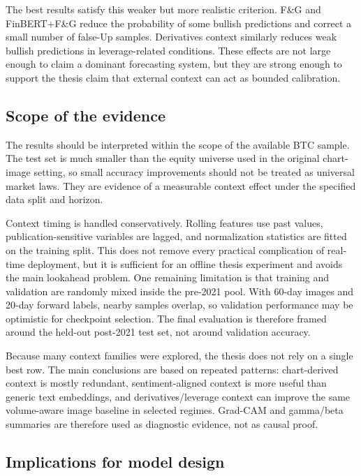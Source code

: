 \documentclass[14pt,a4paper]{extarticle}
\begin{document}
The best results satisfy this weaker but more realistic criterion. F\&G and FinBERT+F\&G reduce the probability of some bullish predictions and correct a small number of false-Up samples. Derivatives context similarly reduces weak bullish predictions in leverage-related conditions. These effects are not large enough to claim a dominant forecasting system, but they are strong enough to support the thesis claim that external context can act as bounded calibration.

\subsection{Scope of the evidence}

The results should be interpreted within the scope of the available BTC sample. The test set is much smaller than the equity universe used in the original chart-image setting, so small accuracy improvements should not be treated as universal market laws. They are evidence of a measurable context effect under the specified data split and horizon.

Context timing is handled conservatively. Rolling features use past values, publication-sensitive variables are lagged, and normalization statistics are fitted on the training split. This does not remove every practical complication of real-time deployment, but it is sufficient for an offline thesis experiment and avoids the main lookahead problem. One remaining limitation is that training and validation are randomly mixed inside the pre-2021 pool. With 60-day images and 20-day forward labels, nearby samples overlap, so validation performance may be optimistic for checkpoint selection. The final evaluation is therefore framed around the held-out post-2021 test set, not around validation accuracy.

Because many context families were explored, the thesis does not rely on a single best row. The main conclusions are based on repeated patterns: chart-derived context is mostly redundant, sentiment-aligned context is more useful than generic text embeddings, and derivatives/leverage context can improve the same volume-aware image baseline in selected regimes. Grad-CAM and gamma/beta summaries are therefore used as diagnostic evidence, not as causal proof.

\subsection{Implications for model design}
\end{document}
